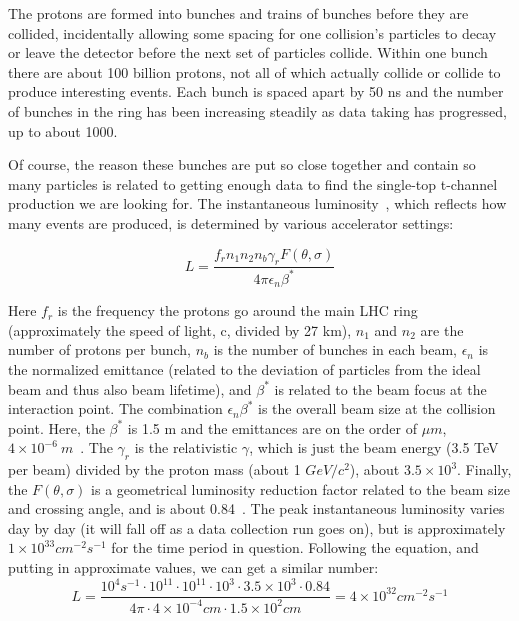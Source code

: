 The protons are formed into bunches and trains of bunches before they are collided, incidentally allowing some spacing for one collision's particles to decay or leave the detector before the next set of particles collide.  Within one bunch there are about 100 billion protons, not all of which actually collide or collide to produce interesting events.  Each bunch is spaced apart by 50 ns and the number of bunches in the ring has been increasing steadily as data taking has progressed, up to about 1000.  

Of course, the reason these bunches are put so close together and contain so many particles is related to getting enough data to find the single-top t-channel production we are looking for.  The instantaneous luminosity~\cite{Luminosityoverview}, which reflects how many events are produced, is determined by various accelerator settings:

\begin{equation} 
L = \frac{f_{r}n_{1}n_{2}n_{b}\gamma_{r}F(\theta,\sigma)}{4\pi \epsilon_{n}\beta^{*}}
\end{equation}

Here $f_{r}$ is the frequency the protons go around the main LHC ring (approximately the speed of light, c,  divided by 27 km), $n_{1}$ and $n_{2}$ are the number of protons per bunch, $n_{b}$ is the number of bunches in each beam, $\epsilon_{n}$ is the normalized emittance (related to the deviation of particles from the ideal beam and thus also beam lifetime), and $\beta^{*}$ is related to the beam focus at the interaction point.  The combination $\epsilon_{n}\beta^{*}$ is the overall beam size at the collision point.  Here, the $\beta^{*}$ is 1.5 m and the emittances are on the order of $\mu m$, $4 \times 10^{-6}~m$~\cite{LHCdetail}.  The $\gamma_{r}$ is the relativistic $\gamma$, which is just the beam energy (3.5 TeV per beam) divided by the proton mass (about 1 $GeV/c^2$), about $3.5\times 10^{3}$.  Finally, the $F(\theta,\sigma)$ is a geometrical luminosity reduction factor 
related to the beam size and crossing angle, and is about 0.84~\cite{LHC2}.  The peak instantaneous luminosity varies day by day (it will fall off as a data collection run goes on), but is approximately $1 \times 10^{33}cm^{-2}s^{-1}$ for the time period in question.  Following the equation, and putting in approximate values, we can get a similar number:
\begin{equation} 
L = \frac{10^{4}s^{-1} \cdot 10^{11}\cdot 10^{11}\cdot 10^{3}\cdot 3.5\times10^{3}\cdot 0.84}{4 \pi \cdot 4\times 10^{-4} cm \cdot 1.5\times 10^{2} cm} = 4 \times 10^{32}cm^{-2}s^{-1}
\end{equation}

